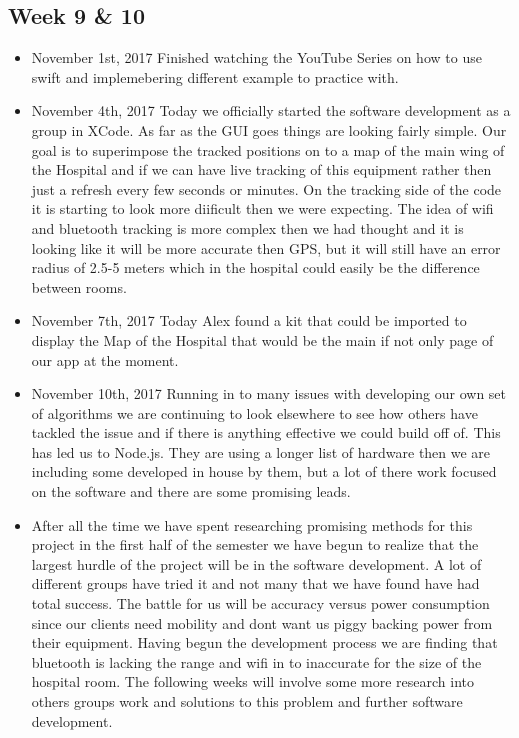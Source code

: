 \documentclass[12pt]{article}
\begin{document}
	\subsection{Week 9 \& 10}
		\begin{itemize}
			\item November 1st, 2017 Finished watching the YouTube Series on how to use swift and implemebering different example to practice with.
			\item November 4th, 2017 Today we officially started the software development as a group in XCode.  As far as the GUI goes things are looking fairly simple.  Our goal is to superimpose the tracked positions on to a map of the main wing of the Hospital and if we can have live tracking of this equipment rather then just a refresh every few seconds or minutes.  On the tracking side of the code it is starting to look more diificult then we were expecting.  The idea of wifi and bluetooth tracking is more complex then we had thought and it is looking like it will be more accurate then GPS, but it will still have an error radius of 2.5-5 meters which in the hospital could easily be the difference between rooms.
			\item November 7th, 2017 Today Alex found a kit that could be imported to display the Map of the Hospital that would be the main if not only page of our app at the moment.
			\item November 10th, 2017 Running in to many issues with developing our own set of algorithms we are continuing to look elsewhere to see how others have tackled the issue and if there is anything effective we could build off of.  This has led us to Node.js.  They are using a longer list of hardware then we are including some developed in house by them, but a lot of there work focused on the software and there are some promising leads.
			\item After all the time we have spent researching promising methods for this project in the first half of the semester we have begun to realize that the largest hurdle of the project will be in the software development.  A lot of different groups have tried it and not many that we have found have had total success.  The battle for us will be accuracy versus power consumption since our clients need mobility and dont want us piggy backing power from their equipment.  Having begun the development process we are finding that bluetooth is lacking the range and wifi in to inaccurate for the size of the hospital room.  The following weeks will involve some more research into others groups work and solutions to this problem and further software development.
		\end{itemize}
		
\end{document}
